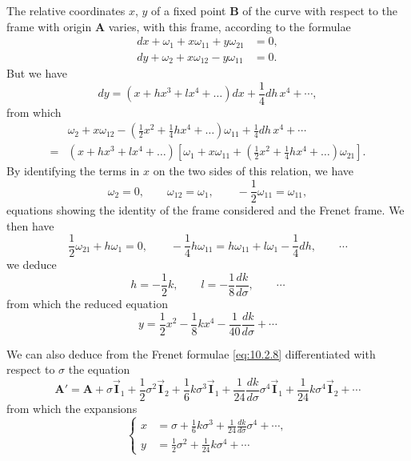 \documentclass[leqno,11pt]{book}
\numberwithin{equation}{chapter}
\theoremstyle{shape1}
\theoremstyle{shapesmall}
\newcommand{\rvec}[1]{\vec{\mathbf{#1}}}
\newcommand{\ivec}{\rvec{I}}
\begin{document}
The relative coordinates $x$, $y$ of a fixed point $\mathbf{B}$ of the curve with respect to the frame with origin $\mathbf{A}$ varies, with this frame, according to the formulae
\begin{align*}
  dx+\omega_{1}+x\omega_{11}+y\omega_{21}&=0,\\
  dy+\omega_{2}+x\omega_{12}-y\omega_{11}&=0.
\end{align*}
But we have
\[
dy=(x+hx^{3}+lx^{4}+\dots)dx+\frac{1}{4}dh\,x^{4}+\cdots,
\]
from which
\begin{align*}
  &{}\omega_{2}+x\omega_{12}-\left(\frac{1}{2}x^{2}+\frac{1}{4}hx^{4}+\dots\right)\omega_{11}+\frac{1}{4}dh\,x^{4}+\cdots\\
  {}={}&{}(x+hx^{3}+lx^{4}+\dots)\left[\omega_{1}+x\omega_{11}+\left(\frac{1}{2}x^{2}+\frac{1}{4}hx^{4}+\dots\right)\omega_{21}\right].
\end{align*}
By identifying the terms in $x$ on the two sides of this relation, we have
\[
\omega_{2}=0,\qquad\omega_{12}=\omega_{1},\qquad-\frac{1}{2}\omega_{11}=\omega_{11},
\]
equations showing the identity of the frame considered and the Frenet frame. We then have
\[
\frac{1}{2}\omega_{21}+h\omega_{1}=0,\qquad-\frac{1}{4}h\omega_{11}=h\omega_{11}+l\omega_{1}-\frac{1}{4}dh,\qquad\cdots
\]
we deduce
\[
h=-\frac{1}{2}k,\qquad l=-\frac{1}{8}\frac{dk}{d\sigma},\qquad \cdots
\]
from which the reduced equation
\begin{equation}
  \label{eq:10.2.17}
  y=\frac{1}{2}x^{2}-\frac{1}{8}kx^{4}-\frac{1}{40}\frac{dk}{d\sigma}+\cdots
\end{equation}

We can also deduce from the Frenet formulae \eqref{eq:10.2.8} differentiated with respect to $\sigma$ the equation
\[
\mathbf{A}'=\mathbf{A}+\sigma\ivec_{1}+\frac{1}{2}\sigma^{2}\ivec_{2}+\frac{1}{6} k\sigma^{3}\ivec_{1}+\frac{1}{24}\frac{dk}{d\sigma}\sigma^{4}\ivec_{1}+\frac{1}{24} k\sigma^{4}\ivec_{2}+\cdots
\]
from which the expansions
\begin{equation}
  \label{eq:10.2.18}
  \left\{
    \begin{aligned}
      x&=\sigma+\frac{1}{6}k\sigma^{3}+\frac{1}{24}\frac{dk}{d\sigma}\sigma^{4}+\cdots,\\
      y&=\frac{1}{2}\sigma^{2}+\frac{1}{24}k\sigma^{4}+\cdots
    \end{aligned}
  \right.
\end{equation}
\end{document}
